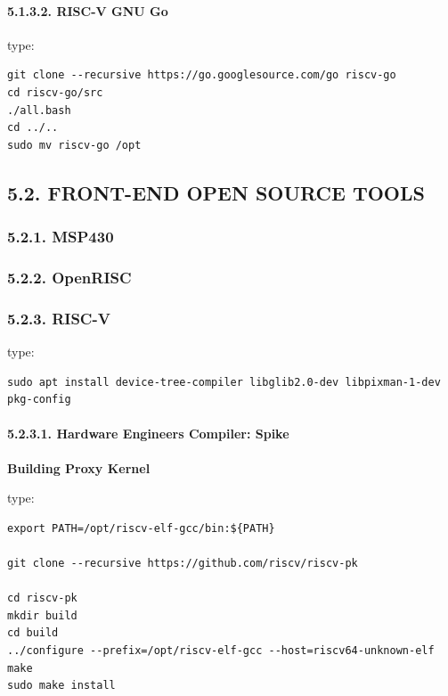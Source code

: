 \documentclass[
]{article}
\begin{document}
\hypertarget{risc-v-gnu-go-1}{%
\paragraph{5.1.3.2. RISC-V GNU Go}\label{risc-v-gnu-go-1}}

type:

\begin{verbatim}
git clone --recursive https://go.googlesource.com/go riscv-go
cd riscv-go/src
./all.bash
cd ../..
sudo mv riscv-go /opt
\end{verbatim}

\hypertarget{front-end-open-source-tools-3}{%
\subsection{5.2. FRONT-END OPEN SOURCE
TOOLS}\label{front-end-open-source-tools-3}}

\hypertarget{msp430-5}{%
\subsubsection{5.2.1. MSP430}\label{msp430-5}}

\hypertarget{openrisc-5}{%
\subsubsection{5.2.2. OpenRISC}\label{openrisc-5}}

\hypertarget{risc-v-5}{%
\subsubsection{5.2.3. RISC-V}\label{risc-v-5}}

type:

\begin{verbatim}
sudo apt install device-tree-compiler libglib2.0-dev libpixman-1-dev pkg-config
\end{verbatim}

\hypertarget{hardware-engineers-compiler-spike-1}{%
\paragraph{5.2.3.1. Hardware Engineers Compiler:
Spike}\label{hardware-engineers-compiler-spike-1}}

\textbf{Building Proxy Kernel}

type:

\begin{verbatim}
export PATH=/opt/riscv-elf-gcc/bin:${PATH}

git clone --recursive https://github.com/riscv/riscv-pk

cd riscv-pk
mkdir build
cd build
../configure --prefix=/opt/riscv-elf-gcc --host=riscv64-unknown-elf
make
sudo make install
\end{verbatim}
\end{document}
